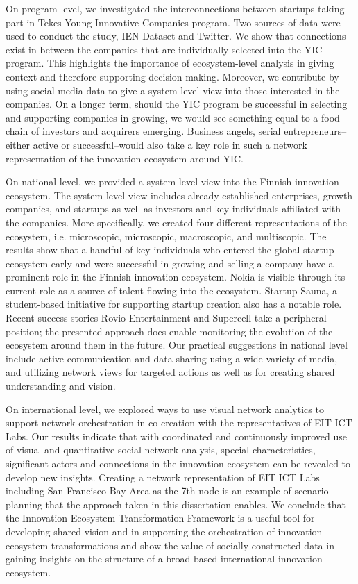 On program level, we investigated the interconnections between startups taking part in Tekes Young Innovative Companies program. Two sources of data were used to conduct the study, IEN Dataset and Twitter. We show that connections exist in between the companies that are individually selected into the YIC program. This highlights the importance of ecosystem-level analysis in giving context and therefore supporting decision-making. Moreover, we contribute by using social media data to give a system-level view into those interested in the companies. On a longer term, should the YIC program be successful in selecting and supporting companies in growing, we would see something equal to a food chain of investors and acquirers emerging. Business angels, serial entrepreneurs--either active or successful--would also take a key role in such a network representation of the innovation ecosystem around YIC.

On national level, we provided a system-level view into the Finnish innovation ecosystem. The system-level view includes already established enterprises, growth companies, and startups as well as investors and key individuals affiliated with the companies. More specifically, we created four different representations of the ecosystem, i.e. microscopic, microscopic, macroscopic, and multiscopic. The results show that a handful of key individuals who entered the global startup ecosystem early and were successful in growing and selling a company have a prominent role in the Finnish innovation ecosystem. Nokia is visible through its current role as a source of talent flowing into the ecosystem. Startup Sauna, a student-based initiative for supporting startup creation also has a notable role. Recent success stories Rovio Entertainment and Supercell take a peripheral position; the presented approach does enable monitoring the evolution of the ecosystem around them in the future. Our practical suggestions in national level include active communication and data sharing using a wide variety of media, and utilizing network views for targeted actions as well as for creating shared understanding and vision.

On international level, we explored ways to use visual network analytics to support network orchestration in co-creation with the representatives of EIT ICT Labs. Our results indicate that with coordinated and continuously improved use of visual and quantitative social network analysis, special characteristics, significant actors and connections in the innovation ecosystem can be revealed to develop new insights. Creating a network representation of EIT ICT Labs including San Francisco Bay Area as the 7th node is an example of scenario planning that the approach taken in this dissertation enables. We conclude that the Innovation Ecosystem Transformation Framework \citep{Russell2011TransformingOrchestration} is a useful tool for developing shared vision and in supporting the orchestration of innovation ecosystem transformations and show the value of socially constructed data in gaining insights on the structure of a broad-based international innovation ecosystem.

